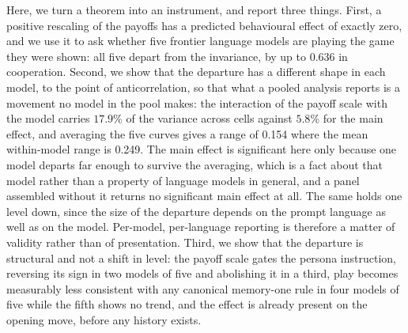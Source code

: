 \documentclass[11pt,a4paper]{article}
\newcommand{\lam}{\lambda}
\newcommand{\ci}[2]{(95\% CI #1, #2)}
\begin{document}
Here, we turn a theorem into an instrument, and report three things. First, a
positive rescaling of the payoffs has a predicted behavioural effect of
exactly zero, and we use it to ask whether five frontier language models are
playing the game they were shown: all five depart from the invariance, by up
to 0.636 in cooperation. Second, we show that the departure has a different
shape in each model, to the point of anticorrelation, so that what a pooled
analysis reports is a movement no model in the pool makes: the interaction of
the payoff scale with the model carries $17.9\%$ of the variance across cells
against $5.8\%$ for the main effect, and averaging the five curves gives a
range of 0.154 where the mean within-model range is 0.249. The main effect is
significant here only because one model departs far enough to survive the
averaging, which is a fact about that model rather than a property of language
models in general, and a panel assembled without it returns no significant main
effect at all. The same holds one level down, since the size of the departure
depends on the prompt language as well as on the model.
Per-model, per-language reporting is therefore a matter of validity rather than
of presentation. Third, we show that the departure is structural and not a
shift in level: the payoff scale gates the persona instruction, reversing its
sign in two models of five and abolishing it in a third, play becomes
measurably less consistent with any
canonical memory-one rule in four models of five while the fifth shows no
trend, and the effect is already present on the opening
move, before any history exists.

%


%
%
\end{document}
